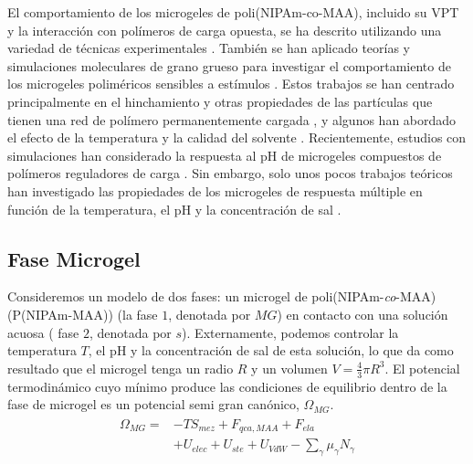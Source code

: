 El comportamiento de los microgeles de poli(NIPAm-co-MAA), incluido su VPT y la interacci\'on con pol\'imeros de carga opuesta, se ha descrito utilizando una variedad de t\'ecnicas experimentales \cite{Hoare2004,Dowding2000,Kleinen2008,Kleinen2010, Giussi2015, Su2016,Giussi2020}.
Tambi\'en se han aplicado teor\'ias  y simulaciones moleculares de grano grueso para investigar el comportamiento de los microgeles polim\'ericos sensibles a est\'imulos \cite{quesada2011gel,ahualli2016coarse,Landsgesell2019SM}.
Estos trabajos se han centrado principalmente en el hinchamiento y otras propiedades de las part\'iculas que tienen una red de pol\'imero permanentemente cargada , y algunos han abordado el efecto de la temperatura y la calidad del solvente \cite{Jha2011, QuesadaPerez2013, moncho-jorda2016a, ahualli2016coarse, AdroherBenitez2017PCCP}.
Recientemente, estudios  con simulaciones han considerado la respuesta al pH de microgeles compuestos de pol\'imeros reguladores de carga \cite{Schroeder2015,Rud2017,Sean2018, Hofzumahaus2018,Lu2019}.
Sin embargo, solo unos pocos trabajos te\'oricos han investigado las propiedades de los microgeles de respuesta m\'ultiple en funci\'on de la temperatura, el pH y la concentración de sal  \cite{CaprilesGonzalez2008,polotsky2013collapse}.


\subsection{Fase Microgel}\label{sec:gel:theory}


Consideremos un modelo de dos fases: un microgel de poli(NIPAm-\emph{co}-MAA) (P(NIPAm-MAA)) (la fase $1$, denotada por $MG$) en contacto con una soluci\'on acuosa ( fase $2$, denotada por $s$).
Externamente, podemos controlar la temperatura $T$, el pH y la concentraci\'on de sal de esta soluci\'on, lo que da como resultado que el microgel tenga un radio $R$ y un volumen $V=\frac{4}{3}\pi R^3$.
El potencial termodin\'amico cuyo m\'inimo produce las condiciones de equilibrio dentro de la fase de microgel es un  potencial semi gran can\'onico, $\Omega_{MG}$.
%
\begin{align}
    \begin{aligned}
       \Omega_{MG}=& -TS_{mez} + F_{qca,MAA} +  F_{ela}\\
       & + U_{elec}+  U_{ste} + U_{VdW} -{\sum_{\gamma}
        {\mu_\gamma N_\gamma}}
    \end{aligned}
    \label{eq:gel:free-energy-implicit}
\end{align}
%

